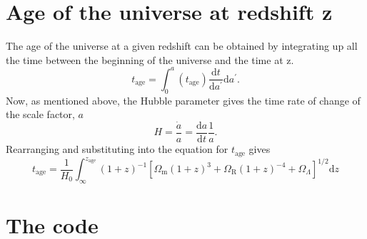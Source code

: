\documentclass[]{article}
\begin{document}
\section{Age of the universe at redshift z}

The age of the universe at a given redshift can be obtained by integrating up all the time between the beginning of the universe and the time at z. 
\begin{equation}
t_\mathrm{age} = \int_0^a(t_\mathrm{age}) \frac{\mathrm{d}t}{\mathrm{d}a^\prime} \mathrm{d}a^\prime.
\end{equation}
Now, as mentioned above, the Hubble parameter gives the time rate of change of the scale factor, $a$
\begin{equation}
H = \frac{\dot a}{a} = \frac{\mathrm{d}a}{\mathrm{d}t}\frac{1}{a}.
\end{equation}
Rearranging and substituting into the equation for $t_\mathrm{age}$ gives 
\begin{equation}
\boxed{t_\mathrm{age} = \frac{1}{H_0}\int_\infty^{z_\mathrm{age}} (1+z)^{-1} [\Omega_\mathrm{m} (1+z)^{3}+\Omega_\mathrm{R} (1+z)^{-4}+\Omega_\Lambda]^{1/2} \mathrm{d}z}
\label{eq:tage}
\end{equation}

\section{The code}
\end{document}
